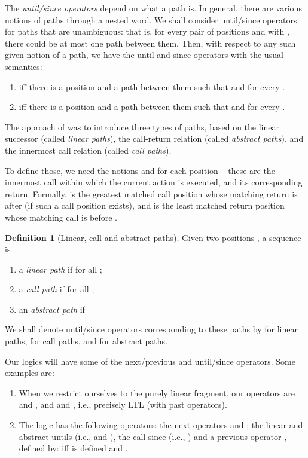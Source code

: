 \documentclass{LMCS}
\theoremstyle{plain}
\theoremstyle{definition}
\newtheorem{definition}{Definition}[section]
\newcounter{example}
\begin{document}
The {\em until/since operators} depend on what a path is.
In general, there are various notions of paths through a nested word.
We shall consider until/since operators for paths that are unambiguous: that is, for
every pair of positions  and  with , there could be at
most one path between them. 
Then, with respect to any such given notion of a path, we
have the until and since operators with the usual semantics:
\begin{enumerate}[]
\item  iff there is a position  and a path  between them such that
   and  for every .
\item  iff there is a position  and a path  between them such that
   and  for every .
\end{enumerate}

The approach of  was to introduce three types of paths, based on
the linear successor (called {\em linear paths}), the call-return
relation (called {\em abstract paths}), and  the innermost
call relation (called {\em call paths}).

To define those, 
we need the notions  and  for each position 
-- these are the innermost call within which the current action  is
executed, and its corresponding return. 
Formally,  is the greatest
matched call position  whose 
matching return is after  (if such
a call position exists), and  is the least matched 
return position  whose matching call is before .



\begin{definition}[Linear, call and abstract paths]
Given two
 positions , a sequence 
is 
\begin{enumerate}[]
\item a {\em linear path} if  for all ;
\item a {\em call path} if  for all ;
\item an {\em abstract path} if 
\end{enumerate}
We shall denote until/since operators corresponding to these paths by 
 for linear paths,  for call paths, and 
for abstract paths.
\end{definition}



Our logics will have some of the next/previous and until/since operators. 
Some examples are:
\begin{enumerate}[]
\item When we 
restrict ourselves to the purely linear fragment, our operators are
 and , and  and , i.e., precisely LTL 
(with past operators).
\item
The logic  \cite{AEM04} has the following operators:
the next operators  and ;
the linear and abstract untils (i.e.,  and ), the call
since (i.e., ) and a previous operator ,
defined by:  
 iff  is defined and .
\end{enumerate}
\end{document}
